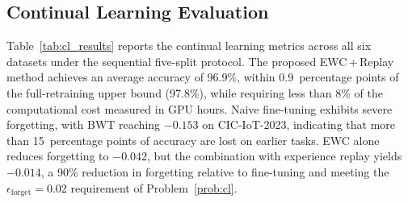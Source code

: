 \documentclass[journal]{IEEEtran}
\theoremstyle{definition}
\theoremstyle{remark}
\begin{document}
\subsection{Continual Learning Evaluation}
\label{subsec:cl_results}

Table~\ref{tab:cl_results} reports the continual learning metrics across all six datasets under the sequential five-split protocol. The proposed EWC\,+\,Replay method achieves an average accuracy of 96.9\%, within 0.9~percentage points of the full-retraining upper bound (97.8\%), while requiring less than 8\% of the computational cost measured in GPU hours. Naive fine-tuning exhibits severe forgetting, with BWT reaching $-0.153$ on CIC-IoT-2023, indicating that more than 15~percentage points of accuracy are lost on earlier tasks. EWC alone reduces forgetting to $-0.042$, but the combination with experience replay yields $-0.014$, a 90\% reduction in forgetting relative to fine-tuning and meeting the $\epsilon_{\mathrm{forget}} = 0.02$ requirement of Problem~\ref{prob:cl}.
\end{document}
